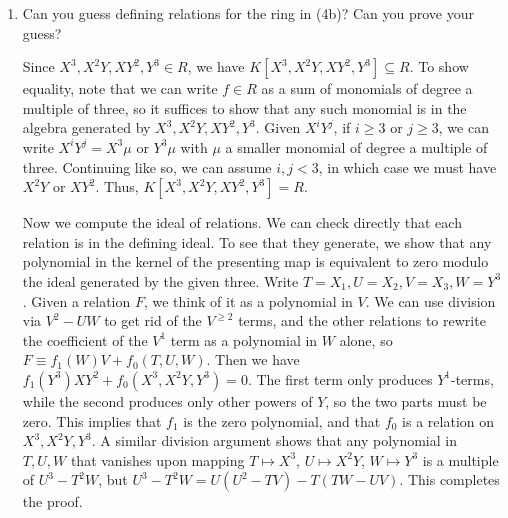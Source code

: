 \documentclass[12pt]{amsart}
\newcommand{\Q}{\mathbb{Q}}
\newcommand{\Z}{\mathbb{Z}}
\newcommand{\solution}[1]{\ifthenelse {\equal{\displaysol}{1}} {\begin{framed}{\color{meretale}\noindent #1}\end{framed}} { \ }}
\newcommand\itemB{\stepcounter{enumi}\item[(\theenumi)]}
\begin{document}
\begin{enumerate}
\itemB Can you guess defining relations for the ring in (4b)? Can you prove your guess?

\solution{ Since $X^3,X^2Y,XY^2,Y^3\in R$, we have $K[X^3,X^2Y,XY^2,Y^3] \subseteq R$. To show equality, note that we can write $f\in R$ as a sum of monomials of degree a multiple of three, so it suffices to show that any such monomial is in the algebra generated by $X^3,X^2Y,XY^2,Y^3$. Given $X^i Y^j$, if $i\geq 3$ or $j\geq 3$, we can write $X^i Y^j= X^3 \mu$ or $Y^3 \mu$ with $\mu$ a smaller monomial of degree a multiple of three. Continuing like so, we can assume $i,j<3$, in which case we must have $X^2 Y$ or $XY^2$. Thus, $K[X^3,X^2Y,XY^2,Y^3] =R$.

Now we compute the ideal of relations. We can check directly that each relation is in the defining ideal. To see that they generate, we show that any polynomial in the kernel of the presenting map is equivalent to zero modulo the ideal generated by the given three. Write $T=X_1, U=X_2, V=X_3, W=Y^3$. Given a relation $F$, we think of it as a polynomial in $V$. We can use division via $V^2-UW$ to get rid of the $V^{\geq 2}$ terms, and the other relations to rewrite the coefficient of the $V^1$ term as a polynomial in $W$ alone, so $F\equiv f_1(W) V + f_0(T,U,W)$. Then we have $f_1(Y^3) XY^2 + f_0(X^3, X^2Y, Y^3)=0$. The first term only produces $Y^1$-terms, while the second produces only other powers of $Y$, so the two parts must be zero. This implies that $f_1$ is the zero polynomial, and that $f_0$ is a relation on $X^3, X^2Y, Y^3$. A similar division argument shows that any polynomial in $T,U,W$ that vanishes upon mapping $T\mapsto X^3$, $U\mapsto X^2 Y$, $W\mapsto Y^3$ is a multiple of $U^3-T^2W$, but $U^3-T^2W=U(U^2-TV)-T(TW-UV)$. This completes the proof.
}





 







\end{enumerate}


\vfill
\end{document}
